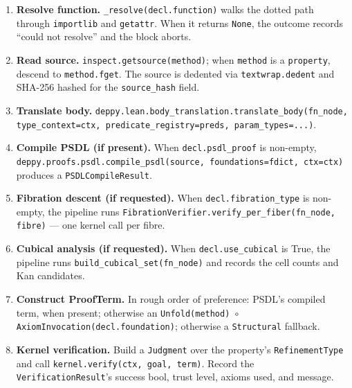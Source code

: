 \begin{enumerate}[leftmargin=1.7em]
  \item \textbf{Resolve function.}  \texttt{\_resolve(decl.function)}
    walks the dotted path through \texttt{importlib} and
    \texttt{getattr}.  When it returns \texttt{None}, the outcome
    records ``could not resolve'' and the block aborts.

  \item \textbf{Read source.}  \texttt{inspect.getsource(method)};
    when \texttt{method} is a \texttt{property}, descend to
    \texttt{method.fget}.  The source is dedented via
    \texttt{textwrap.dedent} and SHA-256 hashed for the
    \texttt{source\_hash} field.

  \item \textbf{Translate body.}
    \texttt{deppy.lean.body\_translation.translate\_body(fn\_node,
    type\_context=ctx, predicate\_registry=preds, param\_types=...)}.

  \item \textbf{Compile PSDL (if present).}  When \texttt{decl.psdl\_proof}
    is non-empty, \texttt{deppy.proofs.psdl.compile\_psdl(source,
    foundations=fdict, ctx=ctx)} produces a
    \texttt{PSDLCompileResult}.

  \item \textbf{Fibration descent (if requested).}  When
    \texttt{decl.fibration\_type} is non-empty, the pipeline runs
    \texttt{FibrationVerifier.verify\_per\_fiber(fn\_node, fibre)}
    --- one kernel call per fibre.

  \item \textbf{Cubical analysis (if requested).}  When
    \texttt{decl.use\_cubical} is True, the pipeline runs
    \texttt{build\_cubical\_set(fn\_node)} and records the cell
    counts and Kan candidates.

  \item \textbf{Construct ProofTerm.}  In rough order of preference:
    PSDL's compiled term, when present; otherwise an
    \texttt{Unfold(method) \(\circ\) AxiomInvocation(decl.foundation)};
    otherwise a \texttt{Structural} fallback.

  \item \textbf{Kernel verification.}  Build a \texttt{Judgment}
    over the property's \texttt{RefinementType} and call
    \texttt{kernel.verify(ctx, goal, term)}.  Record the
    \texttt{VerificationResult}'s success bool, trust level,
    axioms used, and message.
\end{enumerate}

